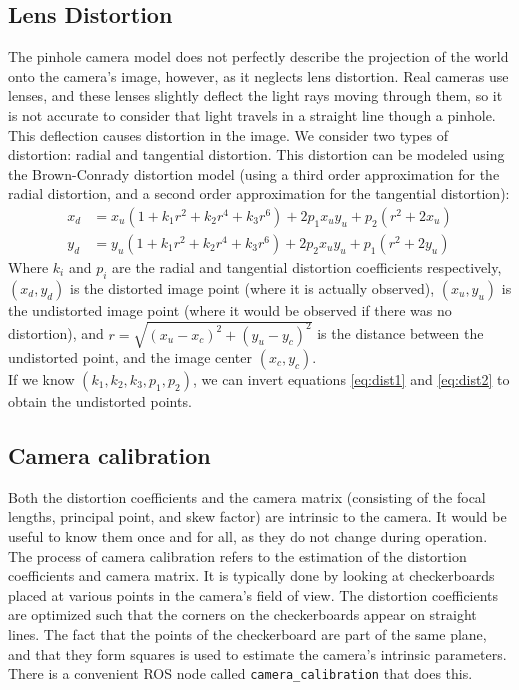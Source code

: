 \subsection{Lens Distortion}
The pinhole camera model does not perfectly describe the projection of the world onto the camera's image, however, as it neglects lens distortion. Real cameras use lenses, and these lenses slightly deflect the light rays moving through them, so it is not accurate to consider that light travels in a straight line though a pinhole. This deflection causes distortion in the image. We consider two types of distortion: radial and tangential distortion. This distortion can be modeled using the Brown-Conrady distortion model (using a third order approximation for the radial distortion, and a second order approximation for the tangential distortion):
\begin{align}
	x_d &= x_u(1+k_1r^2+k_2r^4 + k_3r^6) + 2p_1x_uy_u + p_2(r^2 + 2x_u) \label{eq:dist1}\\
	y_d &= y_u(1+k_1r^2+k_2r^4 + k_3r^6) + 2p_2x_uy_u + p_1(r^2 + 2y_u) \label{eq:dist2}
\end{align}
Where $k_i$ and $p_i$ are the radial and tangential distortion coefficients respectively, $(x_d,y_d)$ is the distorted image point (where it is actually observed), $(x_u,y_u)$ is the undistorted image point (where it would be observed if there was no distortion), and $r = \sqrt{(x_u - x_c)^2 + (y_u - y_c)^2}$ is the distance between the undistorted point, and the image center $(x_c, y_c)$.  \\
If we know $(k_1,k_2,k_3,p_1,p_2)$, we can invert equations \ref{eq:dist1} and \ref{eq:dist2} to obtain the undistorted points. \cite{opencvcamcalib}

\subsection{Camera calibration}
Both the distortion coefficients and the camera matrix (consisting of the focal lengths, principal point, and skew factor) are intrinsic to the camera. It would be useful to know them once and for all, as they do not change during operation.\\

The process of camera calibration refers to the estimation of the distortion coefficients and camera matrix. It is typically done by looking at checkerboards placed at various points in the camera's field of view. The distortion coefficients are optimized such that the corners on the checkerboards appear on straight lines. The fact that the points of the checkerboard are part of the same plane, and that they form squares is used to estimate the camera's intrinsic parameters. There is a convenient ROS node called \texttt{camera\_calibration} that does this.\\

